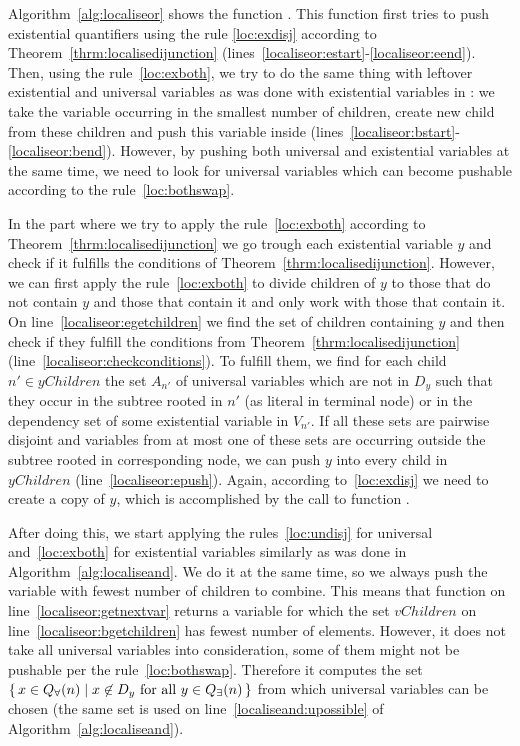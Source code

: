 \documentclass[
  digital, %
  color,
  twoside, %
  table,   %
  nolof,     %
  nolot,     %
]{fithesis3}
\let\setbuilder\set
\newcommand{\simpleset}[1]{\{{#1}\}}
\renewcommand{\set}[1]{\normalexpandarg\IfSubStr{#1}{|}{\setbuilder{#1}}{\simpleset{#1}}}
\theoremstyle{definition}
\theoremstyle{remark}
\newcommand{\vars}[1]{V_{#1}}
\newcommand{\eprefix}[1]{Q_{\exists}(#1)}
\newcommand{\uprefix}[1]{Q_{\forall}(#1)}
\begin{document}
Algorithm~\ref{alg:localiseor} shows the function . This function first tries to push existential quantifiers using the rule \eqref{loc:exdisj} according to Theorem~\ref{thrm:localisedijunction} (lines~\ref{localiseor:estart}-\ref{localiseor:eend}). Then, using the rule~\eqref{loc:exboth}, we try to do the same thing with leftover existential and universal variables as was done with existential variables in : we take the variable occurring in the smallest number of children, create new child from these children and push this variable inside (lines~\ref{localiseor:bstart}-\ref{localiseor:bend}). However, by pushing both universal and existential variables at the same time, we need to look for universal variables which can become pushable according to the rule~\eqref{loc:bothswap}.

In the part where we try to apply the rule~\eqref{loc:exboth} according to Theorem~\ref{thrm:localisedijunction} we go trough each existential variable $y$ and check if it fulfills the conditions of Theorem~\ref{thrm:localisedijunction}. However, we can first apply the rule~\eqref{loc:exboth} to divide children of $y$ to those that do not contain $y$ and those that contain it and only work with those that contain it. On line~\ref{localiseor:egetchildren} we find the set of children containing $y$ and then check if they fulfill the conditions from Theorem~\ref{thrm:localisedijunction} (line~\ref{localiseor:checkconditions}). To fulfill them, we find for each child $n' \in yChildren$ the set $A_{n'}$ of universal variables which are not in $D_y$ such that they occur in the subtree rooted in $n'$ (as literal in terminal node) or in the dependency set of some existential variable in $\vars{n'}$. If all these sets are pairwise disjoint and variables from at most one of these sets are occurring outside the subtree rooted in corresponding node, we can push $y$ into every child in $yChildren$ (line~\ref{localiseor:epush}). Again, according to~\eqref{loc:exdisj} we need to create a copy of $y$, which is accomplished by the call to function .

After doing this, we start applying the rules~\eqref{loc:undisj} for universal and~\eqref{loc:exboth} for existential variables similarly as was done in Algorithm~\ref{alg:localiseand}. We do it at the same time, so we always push the variable with fewest number of children to combine. This means that function  on line~\ref{localiseor:getnextvar} returns a variable for which the set $vChildren$ on line~\ref{localiseor:bgetchildren} has fewest number of elements. However, it does not take all universal variables into consideration, some of them might not be pushable per the rule~\eqref{loc:bothswap}. Therefore it computes the set $\set{x \in \uprefix{n} | x \not\in D_y \text{ for all } y \in \eprefix{n}}$ from which universal variables can be chosen (the same set is used on line~\ref{localiseand:upossible} of Algorithm~\ref{alg:localiseand}).
\end{document}
